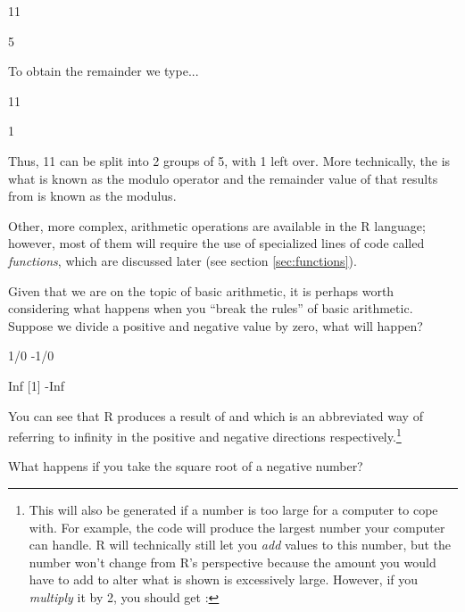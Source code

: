 \begin{inR}
11 %
\end{inR}

\begin{outR}
[1] 5
\end{outR}

To obtain the remainder we type...

\begin{inR}
11 %
\end{inR}

\begin{outR}
[1] 1
\end{outR}

Thus, 11 can be split into 2 groups of 5, with 1 left over.  More technically, the \R{\%\%} is what is known as the \gls{modulo operator} and the remainder value of  that results from  is known as the \gls{modulus}.

Other, more complex, arithmetic operations are available in the R language; however, most of them will require the use of specialized lines of code called \textit{functions}, which are discussed later (see section \ref{sec:functions}). 

Given that we are on the topic of basic arithmetic, it is perhaps worth considering what happens when you ``break the rules'' of basic arithmetic. Suppose we divide a positive and negative value by zero, what will happen?

\begin{inR}
1/0
-1/0
\end{inR}
\begin{outR}
[1] Inf
[1] -Inf
\end{outR}

\noindent
You can see that R produces a result of  and  which is an abbreviated way of referring to \gls{infinity} in the positive and negative directions respectively.\footnote{This will also be generated if a number is too large for a computer to cope with. For example, the code  will produce the largest number your computer can handle. R will technically still let you \textit{add} values to this number, but the number won't change from R's perspective because the amount you would have to add to alter what is shown is excessively large. However, if you \textit{multiply} it by 2, you should get : 
}

What happens if you take the square root of a negative number? 


